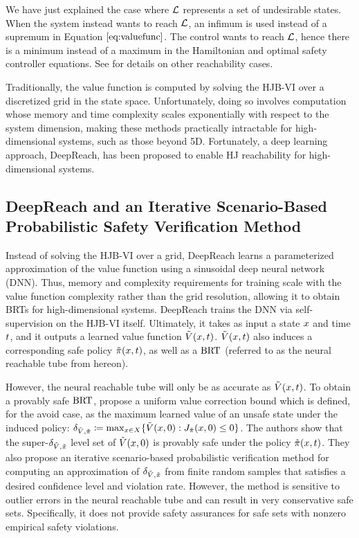 We have just explained the case where $\mathcal{L}$ represents a set of undesirable states. When the system instead wants to reach $\mathcal{L}$, an infimum is used instead of a supremum in Equation $\eqref{eq:valuefunc}$.
The control wants to reach $\mathcal{L}$, hence there is a minimum instead of a maximum in the Hamiltonian and optimal safety controller equations. See \citet{bansal2017hamilton} for details on other reachability cases.

Traditionally, the value function is computed by solving the HJB-VI over a discretized grid in the state space. Unfortunately, doing so involves computation whose memory and time complexity scales exponentially with respect to the system dimension, making these methods practically intractable for high-dimensional systems, such as those beyond 5D. Fortunately, a deep learning approach, DeepReach, has been proposed to enable HJ reachability for high-dimensional systems. 

\vspace{-1em}
\subsection{DeepReach and an Iterative Scenario-Based Probabilistic Safety Verification Method} \label{sec:deepreach_iterative_verification}
\vspace{-0.5em}
Instead of solving the HJB-VI over a grid, DeepReach \citep{bansal2021deepreach} learns a parameterized approximation of the value function using a sinusoidal deep neural network (DNN). Thus, memory and complexity requirements for training scale with the value function complexity rather than the grid resolution, allowing it to obtain BRTs for high-dimensional systems.
DeepReach trains the DNN via self-supervision on the HJB-VI itself. 
Ultimately, it takes as input a state $x$ and time $t$, and it outputs a learned value function $\Tilde{V}(x,t)$.
$\Tilde{V}(x,t)$ also induces a corresponding safe policy $\Tilde{\pi}(x,t)$, as well as a $\text{BRT}$ (referred to as the neural reachable tube from hereon).

However, the neural reachable tube will only be as accurate as $\Tilde{V}(x,t)$. To obtain a provably safe $\text{BRT}$, \citet{lin2023generating} propose a uniform value correction bound which is defined, for the avoid case, as the maximum learned value of an unsafe state under the induced policy: $\delta_{\Tilde{V},\Tilde{\pi}} \coloneqq \max_{x\in X}\{\Tilde{V}(x,0): J_{\Tilde{\pi}}(x,0) \le 0\}$.
The authors show that the super-$\delta_{\Tilde{V},\Tilde{\pi}}$ level set of $\Tilde{V}(x,0)$ is provably safe under the policy $\Tilde{\pi}(x,t)$.
They also propose an iterative scenario-based probabilistic verification method for computing an approximation of $\delta_{\Tilde{V},\Tilde{\pi}}$ from finite random samples that satisfies a desired confidence level and violation rate.
However, the method is sensitive to outlier errors in the neural reachable tube and can result in very conservative safe sets.
Specifically, it does not provide safety assurances for safe sets with nonzero empirical safety violations.

